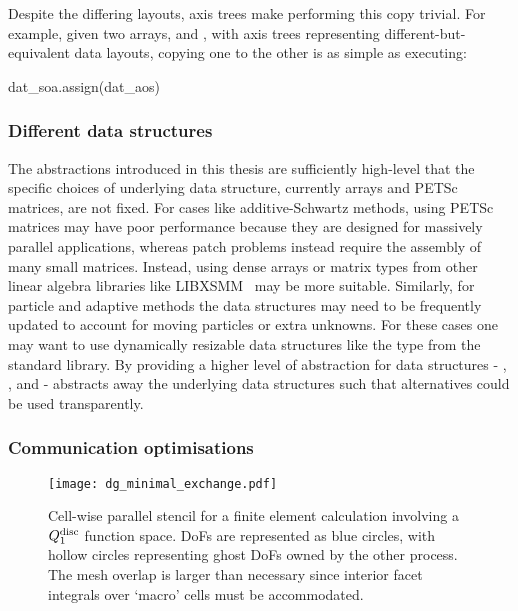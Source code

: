 \documentclass[thesis]{subfiles}
\begin{document}
Despite the differing layouts, axis trees make performing this copy trivial.
For example, given two arrays,  and , with axis trees representing different-but-equivalent data layouts, copying one to the other is as simple as executing:
\begin{pyinline}
  dat_soa.assign(dat_aos)
\end{pyinline}

\subsubsection{Different data structures}

The abstractions introduced in this thesis are sufficiently high-level that the specific choices of underlying data structure, currently \numpy{} arrays and PETSc matrices, are not fixed.
For cases like additive-Schwartz methods, using PETSc matrices may have poor performance because they are designed for massively parallel applications, whereas patch problems instead require the assembly of many small matrices.
Instead, using dense arrays or matrix types from other linear algebra libraries like LIBXSMM~\cite{heineckeLIBXSMMAcceleratingSmall2016} may be more suitable.
Similarly, for particle and adaptive methods the data structures may need to be frequently updated to account for moving particles or extra unknowns.
For these cases one may want to use dynamically resizable data structures like the  type from the \cplusplus{} standard library.
By providing a higher level of abstraction for data structures - , , and  -  abstracts away the underlying data structures such that alternatives could be used transparently.

\subsubsection{Communication optimisations}

\begin{figure}
  \centering
  \texttt{[image: dg\_minimal\_exchange.pdf]}
  \caption{
    Cell-wise parallel stencil for a finite element calculation involving a $Q_1^{\textnormal{disc}}$ function space.
    DoFs are represented as blue circles, with hollow circles representing ghost DoFs owned by the other process.
    The mesh overlap is larger than necessary since interior facet integrals over `macro' cells must be accommodated.
  }
  \label{fig:dg_minimal_exchange}
\end{figure}
\end{document}

